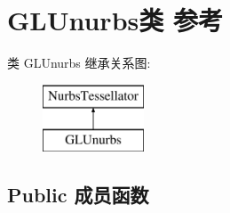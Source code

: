 \hypertarget{class_g_l_unurbs}{}\section{G\+L\+Unurbs类 参考}
\label{class_g_l_unurbs}
类 G\+L\+Unurbs 继承关系图\+:\begin{figure}[H]
\begin{center}
\leavevmode
\includegraphics[height=2.000000cm]{class_g_l_unurbs}
\end{center}
\end{figure}
\subsection*{Public 成员函数}
